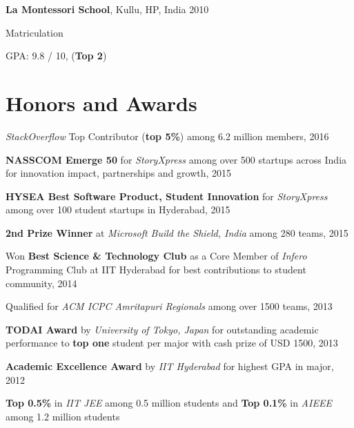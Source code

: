 \documentclass[margin,line]{res}
\newenvironment{list1}{
  \begin{list}{\ding{113}}{%
    \setlength{\itemsep}{0in}
    \setlength{\parsep}{0in} \setlength{\parskip}{0in}
    \setlength{\topsep}{0in} \setlength{\partopsep}{0in}
    \setlength{\leftmargin}{0.17in}}}{\end{list}}
\begin{document}
\begin{resume}
  \vspace*{-2.5mm}

  {\bf La Montessori School}, Kullu, HP, India \hfill 2010 \\
  \vspace*{-.1in}
  \begin{list1}
	\item[] Matriculation
	\item[] GPA: 9.8 / 10, ({\bf Top 2})
  \end{list1}


\section{\sc Honors and Awards}
  {\it StackOverflow} Top Contributor ({\bf top 5\%}) among 6.2 million members, 2016

  \vspace*{-2.5mm}
  {\bf NASSCOM Emerge 50} for {\it StoryXpress} among over 500 startups across India for innovation impact, partnerships and growth, 2015

  \vspace*{-2.5mm}
  {\bf HYSEA Best Software Product, Student Innovation} for {\it StoryXpress} among over 100 student startups in Hyderabad, 2015

  \vspace*{-2.5mm}
  {\bf 2nd Prize Winner} at {\it Microsoft Build the Shield, India} among 280 teams, 2015

  \vspace*{-2.5mm}
  Won {\bf Best Science \& Technology Club} as a Core Member of {\it Infero} Programming Club at IIT Hyderabad for best contributions to student community, 2014

  \vspace*{-2.5mm}
  Qualified for {\it ACM ICPC Amritapuri Regionals} among over 1500 teams, 2013

  \vspace*{-2.5mm}
  {\bf TODAI Award} by {\it University of Tokyo, Japan} for outstanding academic performance to {\bf top one} student per major with cash prize of USD 1500, 2013

  \vspace*{-2.5mm}
  {\bf Academic Excellence Award} by {\it IIT Hyderabad} for highest GPA in major, 2012

  \vspace*{-2.5mm}
  {\bf Top 0.5\%} in {\it IIT JEE} among 0.5 million students and {\bf Top 0.1\%} in {\it AIEEE} among 1.2 million students


\end{resume}
\end{document}
